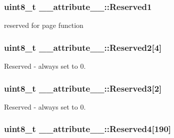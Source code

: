 \subsubsection[{\texorpdfstring{Reserved1}{Reserved1}}]{\setlength{\rightskip}{0pt plus 5cm}uint8\+\_\+t \+\_\+\+\_\+attribute\+\_\+\+\_\+\+::\+Reserved1}\hypertarget{struct____attribute_____a8ace2dfe4814abc401442986ac8a5356}{}\label{struct____attribute_____a8ace2dfe4814abc401442986ac8a5356}


reserved for page function 

\subsubsection[{\texorpdfstring{Reserved2}{Reserved2}}]{\setlength{\rightskip}{0pt plus 5cm}uint8\+\_\+t \+\_\+\+\_\+attribute\+\_\+\+\_\+\+::\+Reserved2\mbox{[}4\mbox{]}}\hypertarget{struct____attribute_____a534ebf7a2bdad17747cfc9cb6cc50c5c}{}\label{struct____attribute_____a534ebf7a2bdad17747cfc9cb6cc50c5c}


Reserved -\/ always set to 0. 

\subsubsection[{\texorpdfstring{Reserved3}{Reserved3}}]{\setlength{\rightskip}{0pt plus 5cm}uint8\+\_\+t \+\_\+\+\_\+attribute\+\_\+\+\_\+\+::\+Reserved3\mbox{[}2\mbox{]}}\hypertarget{struct____attribute_____a9336499af9094522dbe1bfd4d43934a1}{}\label{struct____attribute_____a9336499af9094522dbe1bfd4d43934a1}


Reserved -\/ always set to 0. 

\subsubsection[{\texorpdfstring{Reserved4}{Reserved4}}]{\setlength{\rightskip}{0pt plus 5cm}uint8\+\_\+t \+\_\+\+\_\+attribute\+\_\+\+\_\+\+::\+Reserved4\mbox{[}190\mbox{]}}\hypertarget{struct____attribute_____ab859fb715f83f005dfa2f13d8b0e4ff0}{}\label{struct____attribute_____ab859fb715f83f005dfa2f13d8b0e4ff0}
